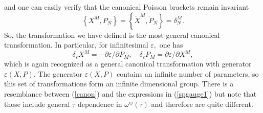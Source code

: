 \documentclass[a4paper,12pt]{article}
\begin{document}
and one can easily verify that the canonical Poisson brackets remain
invariant
\begin{equation}
\left\{ X^{M},P_{N}\right\} =\left\{ \tilde{X}^{M},\tilde{P}_{N}\right\}
=\delta _{N}^{M}.
\end{equation}
So, the transformation we have defined is the most general canonical
transformation. In particular, for infinitesimal $\varepsilon ,$ one has
\begin{equation}
\delta _{\varepsilon }X^{M}=-\partial \varepsilon /\partial P_{M},\quad
\delta _{\varepsilon }P_{M}=\partial \varepsilon /\partial X^{M},
\label{canon}
\end{equation}
which is again recognized as a general canonical transformation with
generator $\varepsilon \left( X,P\right) .$ The generator $\varepsilon
\left( X,P\right) $ contains an infinite number of parameters, so this set
of transformations form an infinite dimensional group. There is a
resemblance between (\ref{canon}) and the expressions in (\ref{spgauge1})
but note that those include general $\tau $ dependence in $\omega
^{ij}\left( \tau \right) $ and therefore are quite different.
\end{document}
